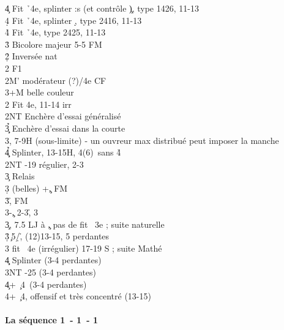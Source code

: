 \documentclass[a4paper]{article}
\begin{document}
\begin{bidtable}
4\c \> Fit \h\ 4e, splinter :s (et contrôle \c ), type 1426, 11-13\\
4\d \> Fit \h\ 4e, splinter \d , type 2416, 11-13\\
4\h \> Fit \h\ 4e, type 2425, 11-13\-\\
3\h \> Bicolore majeur 5-5 FM\-\\
2\d\h \> Inversée nat\+\\
2\s \> F1\\
2M' \> modérateur (?)/4e CF\\
3\s {}+M belle couleur\-\\
2\s \> Fit 4e, 11-14 irr\+\\
2NT \> Enchère d'essai généralisé\\
3\c\d\h \> Enchère d'essai dans la courte\\
3\s {}\s , 7-9H (sous-limite) - un ouvreur max distribué peut imposer la manche\\
4\c\d\h \> Splinter, 13-15H, 4(6)\s\ sans 4\h \-\\
2NT -19 régulier, 2-3\s \+\\
3\c \> Relais\+\\
3\d {} (belles) +\c , FM\\
3\h {}\h , FM\\
3\s {}-\c , 2-3\h , 3\s \-\-\\
3\c {}, 7.5 LJ à \c , pas de fit \s\ 3e ; suite naturelle\\
3\d\h {}\c\ 5\d /\h , (12)13-15, 5 perdantes\\
3\s \> fit \s\ 4e (irrégulier) 17-19 S ; suite Mathé\\
4\c\d \> Splinter (3-4 perdantes)\\
3NT -25 (3-4 perdantes)\\
4\c {}+ \c\ 4\s\ (3-4 perdantes)\\
4\s {}+ \c\ 4\s , offensif et très concentré (13-15)\-\-
\end{bidtable}

\paragraph{La séquence 1\pdfc\ - 1\pdfh\ - 1\pdfs}
\end{document}
